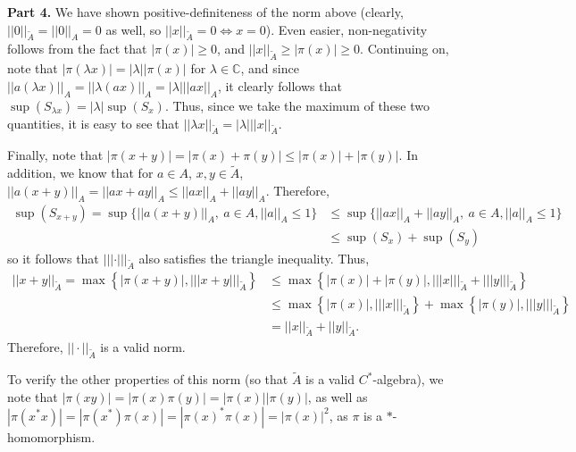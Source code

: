 \documentclass[aps,pra,showpacs,notitlepage,onecolumn,superscriptaddress,nofootinbib]{revtex4-1}
\theoremstyle{definition}
\begin{document}
\noindent \textbf{Part 4.} We have shown positive-definiteness of the norm above (clearly, $||0||_{\widetilde{A}} = ||0||_A = 0$ as well, so $||x||_{\widetilde{A}} = 0 \Leftrightarrow x = 0$). Even easier,
non-negativity follows from the fact that $|\pi(x)| \geq 0$, and $||x||_{\widetilde{A}} \geq |\pi(x)| \geq 0$. Continuing on, note that $|\pi(\lambda x)| = |\lambda| |\pi(x)|$ for $\lambda \in \mathbb{C}$,
and since $||a (\lambda x)||_A = ||\lambda (ax) ||_A = |\lambda| ||ax||_A$, it clearly follows that $\sup(S_{\lambda x}) = |\lambda | \sup(S_x)$. Thus, since we take the maximum of these two quantities, it
is easy to see that $||\lambda x||_{\widetilde{A}} = |\lambda| ||x||_{\widetilde{A}}$.

Finally, note that $|\pi(x + y)| = |\pi(x) + \pi(y)| \leq |\pi(x)| + |\pi(y)|$. In addition, we know that for $a \in A$, $x, y \in \widetilde{A}$, $||a (x + y)||_A = ||ax + ay||_A \leq ||ax||_A + ||ay||_A$. Therefore,
\begin{align}
 \sup(S_{x + y}) = \sup \{ ||a (x + y)||_{A}, \ a \in A, ||a||_A \leq 1\} &\leq \sup \{ ||ax||_{A} + ||ay||_A, \ a \in A, ||a||_A \leq 1\}\\ & \leq \sup(S_x) + \sup(S_y)
\end{align}
so it follows that $||| \cdot |||_{\widetilde{A}}$ also satisfies the triangle inequality. Thus,
\begin{align}
  ||x + y||_{\widetilde{A}} = \max \left\{ |\pi(x + y)|, |||x + y|||_{\widetilde{A}} \right\} &\leq \max \left\{ |\pi(x)| + |\pi(y)|, |||x|||_{\widetilde{A}} + |||y|||_{\widetilde{A}} \right\}
  \\ & \leq \max \left\{ |\pi(x)|, |||x|||_{\widetilde{A}} \right\} + \max \left\{ |\pi(y)|, |||y|||_{\widetilde{A}} \right\} \\ &= ||x||_{\widetilde{A}} + ||y||_{\widetilde{A}}.
  \end{align}
Therefore, $||\cdot||_{\widetilde{A}}$ is a valid norm.

To verify the other properties of this norm (so that $\widetilde{A}$ is a valid $C^{*}$-algebra), we note that $|\pi(xy)| = |\pi(x) \pi(y)| = |\pi(x)||\pi(y)|$, as well as
$|\pi(x^{*} x)| = |\pi(x^{*}) \pi(x)| = |\pi(x)^{*} \pi(x)| = |\pi(x)|^2$, as $\pi$ is a $*$-homomorphism.
\end{document}
